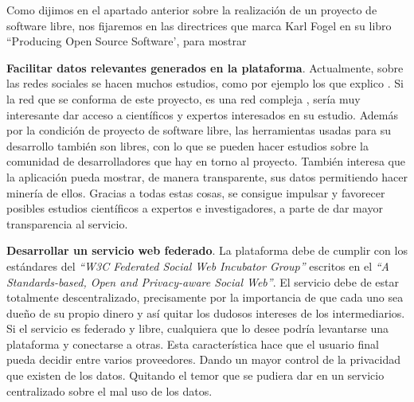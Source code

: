 \documentclass[a4paper, 12pt]{book}
\begin{document}
Como dijimos en el apartado anterior sobre la realización de un proyecto de software libre, nos fijaremos en las directrices que marca Karl Fogel en su libro ``Producing Open Source Software', para mostrar
\item \textbf{Facilitar datos relevantes generados en la plataforma}. 
Actualmente, sobre las redes sociales se hacen muchos estudios, como por 
ejemplo los que explico \cite{JavierBuldú en la charla de ConectaLAB}. Si la 
red que se conforma de este proyecto, es una red compleja \cite{paper}, sería
muy interesante dar acceso a científicos y expertos interesados en su estudio. 
Además por la condición de proyecto de software libre, las herramientas usadas 
para su desarrollo también son libres, con lo que se pueden hacer estudios 
sobre la comunidad de desarrolladores que hay en torno al proyecto. También 
interesa que la aplicación pueda mostrar, de manera transparente, sus datos 
permitiendo hacer minería de ellos. Gracias a todas estas cosas, se consigue 
impulsar y favorecer posibles estudios científicos a expertos e investigadores, 
a parte de dar mayor transparencia al servicio.

\item \textbf{Desarrollar un servicio web federado}. La plataforma debe de 
cumplir con los estándares del \textit{``W3C Federated Social Web Incubator Group''} 
escritos en el \textit{``A Standards-based, Open and Privacy-aware Social Web''}. 
El servicio debe de estar totalmente descentralizado, precisamente por la 
importancia de que cada uno sea dueño de su propio dinero y así quitar los dudosos 
intereses de los intermediarios. Si el servicio es federado y libre, cualquiera 
que lo desee podría levantarse una plataforma y conectarse a otras. Esta 
característica hace que el usuario final pueda decidir entre varios proveedores. 
Dando un mayor control de la privacidad que existen de los datos. Quitando el 
temor que se pudiera dar en un servicio centralizado sobre el mal uso de los 
datos.
\end{document}
